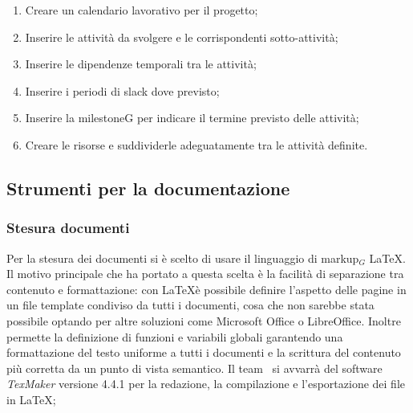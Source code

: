 \begin{enumerate}
	\item Creare un calendario lavorativo per il progetto;
	\item Inserire le attività da svolgere e le corrispondenti sotto-attività;
	\item Inserire le dipendenze temporali tra le attività;
	\item Inserire i periodi di slack dove previsto;
	\item Inserire la milestoneG per indicare il termine previsto delle attività;
	\item Creare le risorse e suddividerle adeguatamente tra le attività definite.
\end{enumerate}


\subsection{Strumenti per la documentazione}
\subsubsection{Stesura documenti}
Per la stesura dei documenti si è scelto di usare il linguaggio di markup$_G$ \LaTeX.
Il motivo principale che ha portato a questa scelta è la facilità di separazione tra contenuto e formattazione: con \LaTeX è possibile definire l’aspetto delle pagine in un file template condiviso da tutti i documenti, cosa che non sarebbe stata possibile optando per altre soluzioni come Microsoft Office o LibreOffice. Inoltre permette la definizione di funzioni e variabili globali garantendo una formattazione del testo uniforme a tutti i documenti e la scrittura del contenuto più corretta da un punto di vista semantico.
Il team \gruppo\ si avvarrà del software \textit{TexMaker} versione 4.4.1 per la redazione, la compilazione e l'esportazione dei file in \LaTeX;

